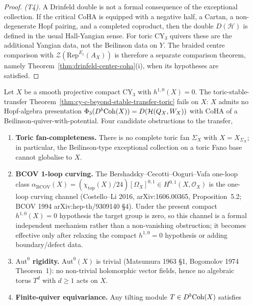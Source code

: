 \begin{proof}
\emph{(T4).} A Drinfeld double is not a formal consequence of the
exceptional collection. If the critical CoHA is equipped with a negative
half, a Cartan, a non-degenerate Hopf pairing, and a completed coproduct,
then the double \(D(\mathcal H)\) is defined in the usual Hall-Yangian
sense. For toric CY$_3$ quivers these are the additional Yangian data,
not the Beilinson data on \(Y\). The braided centre comparison with
\(\mathcal Z(\mathrm{Rep}^{E_1}(A_X))\) is therefore a separate
comparison theorem, namely Theorem~\ref{thm:drinfeld-center-coha}(i),
when its hypotheses are satisfied.
\end{proof}

\begin{theorem}
\label{thm:cy-c-beyond-compact-cy3-25-count}
Let $X$ be a smooth projective compact CY$_3$ with $h^{1,0}(X) = 0$.
The toric-stable-transfer Theorem~\ref{thm:cy-c-beyond-stable-transfer-toric}
fails on $X$: $X$ admits no Hopf-algebra presentation
$\Phi_3(D^b\mathrm{Coh}(X)) = D(\mathcal H(Q_X, W_X))$ with CoHA of a
Beilinson-quiver-with-potential. Four candidate obstructions to the
transfer,
\begin{enumerate}[label=\textup{(O\arabic*)}]
 \item[\textup{(O1)}] \textbf{Toric fan-completeness.} There is no
 complete toric fan $\Sigma_X$ with $X = X_{\Sigma_X}$; in
 particular, the Beilinson-type exceptional collection on a toric
 Fano base cannot globalise to $X$.
 \item[\textup{(O2)}] \textbf{BCOV 1-loop curving.} The
 Bershadsky--Cecotti--Ooguri--Vafa one-loop class
 $\alpha_{\mathrm{BCOV}}(X) = (\chi_{\mathrm{top}}(X)/24)
 [\Omega_X]^{0,1} \in H^{0,1}(X, \mathcal O_X)$
 is the one-loop curving channel
 (Costello--Li 2016, arXiv:1606.00365, Proposition~5.2; BCOV 1994
 arXiv:hep-th/9309140 \S 4). Under the present compact
 $h^{1,0}(X)=0$ hypothesis the target group is zero, so this
 channel is a formal independent mechanism rather than a
 non-vanishing obstruction; it becomes effective only after
 relaxing the compact $h^{1,0}=0$ hypothesis or adding boundary/defect data.
 \item[\textup{(O3)}] \textbf{$\mathrm{Aut}^0$ rigidity.}
 $\mathrm{Aut}^0(X)$ is trivial (Matsumura 1963 \S 1,
 Bogomolov 1974 Theorem~1): no non-trivial holomorphic
 vector fields, hence no algebraic torus $T^d$ with $d \geq 1$
 acts on $X$.
 \item[\textup{(O4)}] \textbf{Finite-quiver equivariance.} Any
 tilting module $T \in D^b\mathrm{Coh}(X)$ satisfies

\end{enumerate}
\end{theorem}
